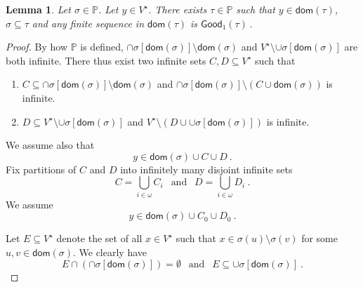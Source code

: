 \documentclass[10pt,a4paper, openany,  oldfontcommands]{memoir}
\newtheorem{lemma} [theorem] {Lemma}
\newtheorem{open problem} [theorem] {Open Problem}
\begin{document}
 
 \begin{lemma}    \label{ZerothLemmaGood}
  Let  $  \sigma  \in   \mathbb{P} $.
Let   $  y  \in V^{  \star }   $. 
There  exists     $  \tau  \in  \mathbb{P}  $  such that 
$  y  \in  \mathsf{dom} \left(   \tau   \right)   $,  
  $  \sigma  \subseteq    \tau  $   and any finite sequence  in  $  \mathsf{dom} \left(  \tau  \right)  $  is    $   \mathsf{Good}_1 \left(   \tau   \right)     \,    $.
 \end{lemma}
  \begin{proof}
  
  
  By how $  \mathbb{P} $ is defined,  
  $   \cap    \sigma  \left[   \mathsf{dom} \left(  \sigma  \right)    \right]     \setminus \mathsf{dom} \left(  \sigma  \right)     $
 and    $ V^{  \star }  \setminus   \cup    \sigma  \left[   \mathsf{dom} \left(  \sigma  \right)    \right]    $
 are both infinite. 
 There thus exist  two infinite sets   $  C,   D   \subseteq  V^{  \star }  $  such that  
 \begin{enumerate}
\item   $  C  \subseteq    \cap    \sigma  \left[   \mathsf{dom} \left(  \sigma  \right)    \right]    \setminus \mathsf{dom} \left(  \sigma  \right)       $  
and  
$   \cap    \sigma  \left[   \mathsf{dom} \left(  \sigma  \right)    \right]      \setminus   \left(   C  \cup  \mathsf{dom} \left(  \sigma  \right)    \right)     $ 
is infinite. 
 
 
 \item   $  D  \subseteq    V^{  \star }  \setminus   \cup    \sigma  \left[   \mathsf{dom} \left(  \sigma  \right)    \right]       $  
and  $   V^{  \star }  \setminus   \left(  D  \cup   \cup    \sigma  \left[   \mathsf{dom} \left(  \sigma  \right)    \right]     \right)   $ 
is infinite. 
 \end{enumerate}
 We assume also that 
 \[
 y  \in   \mathsf{dom} \left(  \sigma  \right)   \cup  C   \cup   D
 \     .
 \]
Fix  partitions of  $  C$  and  $  D  $  into infinitely many disjoint  infinite sets 
\[
C  =   \bigcup_{  i  \in  \omega  }   C_i   
\     \       \mbox{   and    }      \      \    
D  =   \bigcup_{  i  \in  \omega  }   D_i   
\       .
\] 
 We assume
 \[
 y  \in   \mathsf{dom} \left(  \sigma  \right)   \cup  C_0   \cup   D_0
 \     .
 \]







Let  $  E  \subseteq  V^{  \star }  $  denote the set of all $  x  \in   V^{  \star }  $  such that  
$  x  \in  \sigma (u)  \setminus  \sigma (v)  $  for some  $  u,v    \in       \mathsf{dom} \left(  \sigma  \right)    $. 
We clearly have 
\[
E  \cap     \left(    \cap    \sigma  \left[   \mathsf{dom} \left(  \sigma  \right)    \right]    \right)     =  \emptyset  
\     \     \mbox{  and   }     \      \   
E  \subseteq        \cup    \sigma  \left[   \mathsf{dom} \left(  \sigma  \right)    \right]  
\           .
\]







\end{proof}
\end{document}

